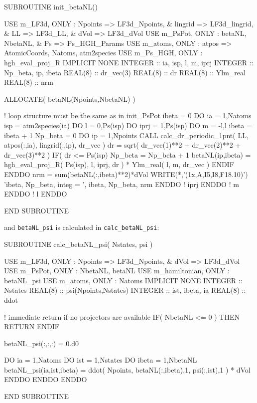 \begin{fortrancode}
SUBROUTINE init_betaNL()

  USE m_LF3d, ONLY : Npoints => LF3d_Npoints, &
                     lingrid => LF3d_lingrid, &
                     LL => LF3d_LL, &
                     dVol => LF3d_dVol
  USE m_PsPot, ONLY : betaNL, NbetaNL, &
                      Ps => Ps_HGH_Params
  USE m_atoms, ONLY : atpos => AtomicCoords, Natoms, atm2species
  USE m_Ps_HGH, ONLY : hgh_eval_proj_R
  IMPLICIT NONE
  INTEGER :: ia, isp, l, m, iprj
  INTEGER :: Np_beta, ip, ibeta
  REAL(8) :: dr_vec(3)
  REAL(8) :: dr
  REAL(8) :: Ylm_real
  REAL(8) :: nrm

  ALLOCATE( betaNL(Npoints,NbetaNL) )

  ! loop structure must be the same as in init_PsPot
  ibeta = 0
  DO ia = 1,Natoms
    isp = atm2species(ia)
    DO l = 0,Ps(isp)%
      DO iprj = 1,Ps(isp)%
        DO m = -l,l
          ibeta = ibeta + 1
          Np_beta = 0
          DO ip = 1,Npoints
            CALL calc_dr_periodic_1pnt( LL, atpos(:,ia), lingrid(:,ip), dr_vec )
            dr = sqrt( dr_vec(1)**2 + dr_vec(2)**2 + dr_vec(3)**2 )
            IF( dr <= Ps(isp)%
              Np_beta = Np_beta + 1
              betaNL(ip,ibeta) = hgh_eval_proj_R( Ps(isp), l, iprj, dr ) * Ylm_real( l, m, dr_vec )
            ENDIF
          ENDDO
          nrm = sum(betaNL(:,ibeta)**2)*dVol
          WRITE(*,'(1x,A,I5,I8,F18.10)') 'ibeta, Np_beta, integ = ', ibeta, Np_beta, nrm
        ENDDO ! iprj
      ENDDO ! m
    ENDDO ! l
  ENDDO

END SUBROUTINE
\end{fortrancode}


and {\tt betaNL\_psi} is calculated in {\tt calc\_betaNL\_psi}:

\begin{fortrancode}
SUBROUTINE calc_betaNL_psi( Nstates, psi )

  USE m_LF3d, ONLY : Npoints => LF3d_Npoints, &
                       dVol => LF3d_dVol
  USE m_PsPot, ONLY : NbetaNL, betaNL
  USE m_hamiltonian, ONLY : betaNL_psi
  USE m_atoms, ONLY : Natoms
  IMPLICIT NONE
  INTEGER :: Nstates
  REAL(8) :: psi(Npoints,Nstates)
  INTEGER :: ist, ibeta, ia
  REAL(8) :: ddot

  ! immediate return if no projectors are available
  IF( NbetaNL <= 0 ) THEN
    RETURN
  ENDIF

  betaNL_psi(:,:,:) = 0.d0

  DO ia = 1,Natoms
    DO ist = 1,Nstates
      DO ibeta = 1,NbetaNL
        betaNL_psi(ia,ist,ibeta) = ddot( Npoints, betaNL(:,ibeta),1, psi(:,ist),1 ) * dVol
      ENDDO
    ENDDO
  ENDDO

END SUBROUTINE
\end{fortrancode}
